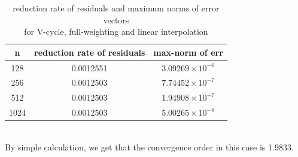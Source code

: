 \documentclass[a4paper,twocolumn]{article}
\theoremstyle{definition}
\begin{document}
\begin{table}[!htp]
	\centering
	\begin{tabular}{|c|c|c|}
		\hline	
		n & reduction rate of residuals &max-norm of err  \\
		\hline		
		128 &0.0012551& $3.09269\times 10^{-6}$ \\
		\hline		
		256 &0.0012503& $7.74452\times 10^{-7}$ \\
		\hline		
		512 &0.0012503& $1.94908\times 10^{-7}$ \\
		\hline		
		1024 &0.0012503& $5.00265\times 10^{-8}$ \\
		\hline
	\end{tabular}
	\caption{reduction rate of residuals and maximum norms of error vectors \\for V-cycle, full-weighting and linear interpolation}
\end{table}\\
By simple calculation, we get that the convergence order in this case is 1.9833.
\end{document}
